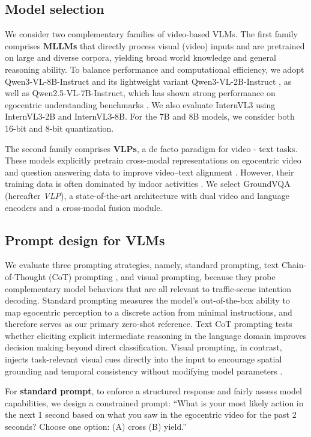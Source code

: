 \documentclass[letterpaper, 10pt, journal]{IEEEtran}  %
\newcommand{\prompt}[1]{#1}
\begin{document}
\subsection{Model selection}
We consider two complementary families of video-based VLMs. The first family comprises \textbf{MLLMs} that directly process visual (video) inputs and are pretrained on large and diverse corpora, yielding broad world knowledge and general reasoning ability.
To balance performance and computational efficiency, we adopt Qwen3-VL-8B-Instruct and its lightweight variant Qwen3-VL-2B-Instruct \cite{qwen3technicalreport}, as well as Qwen2.5-VL-7B-Instruct, which has shown strong performance on egocentric understanding benchmarks \cite{peng2025eye}. We also evaluate InternVL3 \cite{zhu2025internvl3} using InternVL3-2B and InternVL3-8B. For the 7B and 8B models, we consider both 16-bit and 8-bit quantization.

The second family comprises \textbf{VLPs}, a de facto paradigm for video - text tasks. These models explicitly pretrain cross-modal representations on egocentric video and question answering data to improve video--text alignment \cite{pramanick_egovlpv2_2023}. However, their training data is often dominated by indoor activities \cite{damen_scaling_2018, grauman_ego4d_2022}. We select GroundVQA \cite{di_grounded_2024} (hereafter \textit{VLP}), a state-of-the-art architecture with dual video and language encoders and a cross-modal fusion module.


\subsection{Prompt design for VLMs}
We evaluate three prompting strategies, namely, standard prompting, text Chain-of-Thought (CoT) prompting \cite{wei_chain--thought_2022}, and visual prompting, because they probe complementary model behaviors that are all relevant to traffic-scene intention decoding. Standard prompting measures the model's out-of-the-box ability to map egocentric perception to a discrete action from minimal instructions, and therefore serves as our primary zero-shot reference. Text CoT prompting tests whether eliciting explicit intermediate reasoning in the language domain improves decision making beyond direct classification. Visual prompting, in contrast, injects task-relevant visual cues directly into the input to encourage spatial grounding and temporal consistency without modifying model parameters \cite{yang2023set,yang2023fine}.

For \textbf{standard prompt}, to enforce a structured response and fairly assess model capabilities, we design a constrained prompt: \prompt{``What is your most likely action in the next 1 second based on what you saw in the egocentric video for the past 2 seconds? Choose one option: (A) cross (B) yield.''}
\end{document}
